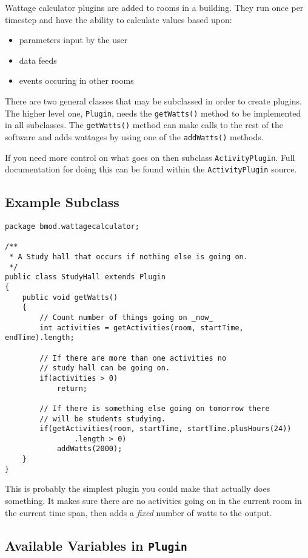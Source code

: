\documentclass[12pt,a4paper]{article}
\begin{document}
Wattage calculator plugins are added to rooms in a building. They run once per
timestep and have the ability to calculate values based upon:

\begin{itemize}
  \item parameters input by the user
  \item data feeds
  \item events occuring in other rooms
\end{itemize}

There are two general classes that may be subclassed in order to create plugins. The higher level one, \texttt{Plugin}, needs the \texttt{getWatts()} method to be implemented in all subclasses. The \texttt{getWatts()} method can make calls to the rest of the software and adds wattages by using one of the \texttt{addWatts()} methods.

If you need more control on what goes on then subclass \texttt{ActivityPlugin}. Full documentation for doing this can be found within the \texttt{ActivityPlugin} source.

\subsection{Example Subclass}

\begin{lstlisting}
package bmod.wattagecalculator;

/**
 * A Study hall that occurs if nothing else is going on.
 */
public class StudyHall extends Plugin
{
	public void getWatts()
	{
		// Count number of things going on _now_
		int activities = getActivities(room, startTime, endTime).length;
		
		// If there are more than one activities no
		// study hall can be going on.
		if(activities > 0)
			return;
		
		// If there is something else going on tomorrow there
		// will be students studying.
		if(getActivities(room, startTime, startTime.plusHours(24))
				.length > 0)
			addWatts(2000);
	}
}
\end{lstlisting}

This is probably the simplest plugin you could make that actually does something. It makes sure there are no activities going on in the current room in the current time span, then adds a \emph{fixed} number of watts to the output.

\subsection[Available Variables in Plugin]{Available Variables in \texttt{Plugin}}
\end{document}
